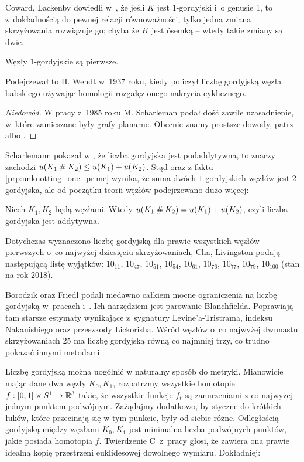 Coward, Lackenby dowiedli w~\cite{coward11}, że jeśli $K$ jest 1-gordyjski i~o genusie 1, to z~dokładnością do pewnej relacji równoważności, tylko jedna zmiana skrzyżowania rozwiązuje go; chyba że $K$ jest ósemką -- wtedy takie zmiany są dwie.

\begin{proposition}
    \label{prp:unknotting_one_prime}
    Węzły $1$-gordyjskie są pierwsze.
\end{proposition}

Podejrzewał to H. Wendt w~1937 roku, kiedy policzył liczbę gordyjską węzła babskiego używając homologii rozgałęzionego nakrycia cyklicznego.

\begin{proof}[Niedowód]
    W pracy \cite{scharleman85} z~1985 roku M. Scharleman podał dość zawiłe uzasadnienie, w~które zamieszane były grafy planarne.
    Obecnie znamy prostsze dowody, patrz \cite{lackenby97} albo \cite{zhang91}.
\end{proof}

Scharlemann pokazał w \cite[wniosek 1.6]{scharlemann98}, że liczba gordyjska jest podaddytywna, to znaczy zachodzi $u(K_1 \mathbin{\#} K_2) \le u(K_1) + u(K_2)$.
Stąd oraz z faktu \ref{prp:unknotting_one_prime} wynika, że suma dwóch $1$-gordyjskich węzłów jest $2$-gordyjska, ale od początku teorii węzłów podejrzewano dużo więcej:

\begin{conjecture}
    Niech $K_1, K_2$ będą węzłami.
    Wtedy $u(K_1 \mathbin{\#} K_2) = u(K_1) + u(K_2)$, czyli liczba gordyjska jest addytywna.
\end{conjecture}

Dotychczas wyznaczono liczbę gordyjską dla prawie wszystkich węzłów pierwszych o~co najwyżej dziesięciu skrzyżowaniach,
Cha, Livingston \cite{cha05} podają następującą listę wyjątków:
$10_{11}$, $10_{47}$, $10_{51}$, $10_{54}$, $10_{61}$, $10_{76}$, $10_{77}$, $10_{79}$, $10_{100}$ (stan na rok 2018).

Borodzik oraz Friedl podali niedawno całkiem mocne ograniczenia na liczbę gordyjską w~pracach \cite{borodzik14} i~\cite{borodzik15}.
Ich narzędziem jest parowanie Blanchfielda.
Poprawiają tam starsze estymaty wynikające z~sygnatury Levine'a-Tristrama, indeksu Nakanishiego oraz przeszkody Lickorisha.
Wśród węzłów o~co najwyżej dwunastu skrzyżowaniach 25 ma liczbę gordyjską równą co najmniej trzy, co trudno pokazać innymi metodami.

Liczbę gordyjską można uogólnić w naturalny sposób do metryki.
Mianowicie mając dane dwa węzły $K_0, K_1$, rozpatrzmy wszystkie homotopie $f : [0,1] \times S^1 \to \mathbb R^3$ takie, że wszystkie funkcje $f_t$ są zanurzeniami z co najwyżej jednym punktem podwójnym.
Zażądajmy dodatkowo, by styczne do krótkich łuków, które przecinają się w tym punkcie, były od siebie różne.
Odległością gordyjską między węzłami $K_0, K_1$ jest minimalna liczba podwójnych punktów, jakie posiada homotopia $f$.
Twierdzenie C~z~pracy \cite{gambaudo05} głosi, że zawiera ona prawie idealną kopię przestrzeni euklidesowej dowolnego wymiaru.
Dokładniej:

